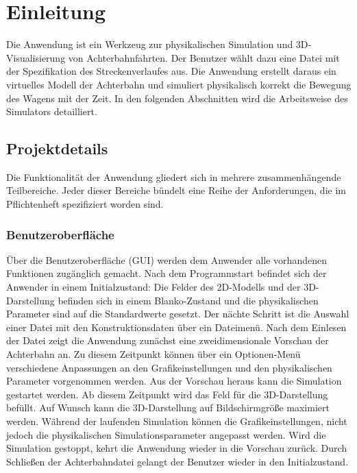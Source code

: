 
\chapter{Einleitung}

Die Anwendung ist ein Werkzeug zur physikalischen Simulation und 3D-Visualisierung von Achterbahnfahrten.
Der Benutzer wählt dazu eine Datei mit der Spezifikation des Streckenverlaufes aus. Die Anwendung erstellt 
daraus ein virtuelles Modell der Achterbahn und simuliert physikalisch korrekt die Bewegung des Wagens mit
der Zeit. In den folgenden Abschnitten wird die Arbeitsweise des Simulators detailliert.

\section{Projektdetails}
Die Funktionalität der Anwendung gliedert sich in mehrere zusammenhängende Teilbereiche. Jeder dieser
Bereiche bündelt eine Reihe der Anforderungen, die im Pflichtenheft spezifiziert worden sind.

\subsection{Benutzeroberfläche}
Über die Benutzeroberfläche (GUI) werden dem Anwender alle vorhandenen Funktionen zugänglich gemacht.
Nach dem Programmstart befindet sich der Anwender in einem Initialzustand: Die Felder des 2D-Modells
und der 3D-Darstellung befinden sich in einem Blanko-Zustand und die physikalischen Parameter sind
auf die Standardwerte gesetzt. Der nächte Schritt ist die Auswahl einer Datei mit den Konstruktionsdaten
über ein Dateimenü. Nach dem Einlesen der Datei zeigt die Anwendung zunächst eine zweidimensionale 
Vorschau der Achterbahn an. Zu diesem Zeitpunkt können über ein Optionen-Menü verschiedene Anpassungen 
an den Grafikeinstellungen und den physikalischen Parameter vorgenommen werden. 
Aus der Vorschau heraus kann die Simulation gestartet werden. Ab diesem Zeitpunkt wird das Feld für 
die 3D-Darstellung befüllt. Auf Wunsch kann die 3D-Darstellung auf Bildschirmgröße
maximiert werden. Während der laufenden Simulation können die Grafikeinstellungen, nicht jedoch
die physikalischen Simulationsparameter angepasst werden. Wird die Simulation gestoppt, kehrt die Anwendung
wieder in die Vorschau zurück. Durch Schließen der Achterbahndatei gelangt der Benutzer wieder in den 
Initialzustand.

